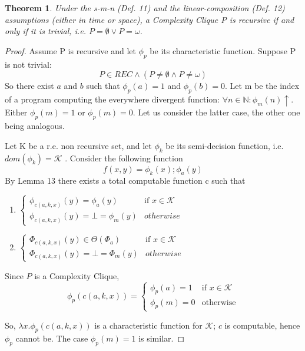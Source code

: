 \documentclass[10pt, a4paper, oneside, titlepage, draft]{article}
\newtheorem{theorem}[shrd]{Theorem}
\begin{document}
\begin{theorem}
    Under the s-m-n (Def. 11) and the linear-composition (Def. 12) assumptions (either in time or space), a Complexity Clique P is recursive if and only if it is trivial, i.e. $P = \emptyset \vee P = \omega$.
\end{theorem}

\begin{proof}
    Assume P is recursive and let $\phi_p$ be its characteristic function. 
    Suppose P is not trivial:
    \begin{equation*}
        P \in REC \wedge (P \neq \emptyset \wedge P \neq \omega)
    \end{equation*}
    So there exist $a$ and $b$ such that $\phi_p(a) = 1$ and $\phi_p(b) = 0$.
    Let m be the index of a program computing the everywhere divergent function: $\forall n \in \mathbb{N} : \phi_m(n) \uparrow$.
    Either $\phi_p(m) = 1$ or $\phi_p(m) = 0$. Let us consider the latter case, the other one being analogous. \par
    Let K be a r.e. non recursive set, and let $\phi_k$ be its semi-decision function, i.e. $dom(\phi_k) = \mathcal{K}$ . Consider the following function 
    \begin{equation*}
        f(x,y) = \phi_k(x); \phi_a(y)
    \end{equation*}
    By Lemma 13 there exists a total computable function c such that
    \begin{enumerate}[label=(\alph*)]
        \item $
            \begin{cases}
                \phi_{c(a,k,x)}(y) = \phi_a(y)  & \text{if  } x \in \mathcal{K} \\
                \phi_{c(a,k,x)}(y) = \bot = \phi_m(y)       & otherwise
            \end{cases}
        $

        \item $
            \begin{cases}
                \Phi_{c(a,k,x)}(y) \in \Theta ( \Phi_a )  & \text{if  } x \in \mathcal{K} \\
                \Phi_{c(a,k,x)}(y) = \bot = \Phi_m(y)       & otherwise
            \end{cases}
        $
    \end{enumerate}
Since $P$ is a Complexity Clique,
    \begin{equation*}
        \phi_p(c(a,k,x)) = 
        \begin{cases}
            \phi_p(a) = 1   & \text{if  } x \in \mathcal{K}           \\
            \phi_p(m) = 0   & \text{otherwise}
        \end{cases}
    \end{equation*}

    So, $\lambda x . \phi_p(c(a,k,x))$ is a characteristic function for $\mathcal{K}$; $c$ is computable, hence $\phi_p$ cannot be. The case $\phi_p(m) = 1$ is similar.

\end{proof}
\end{document}
